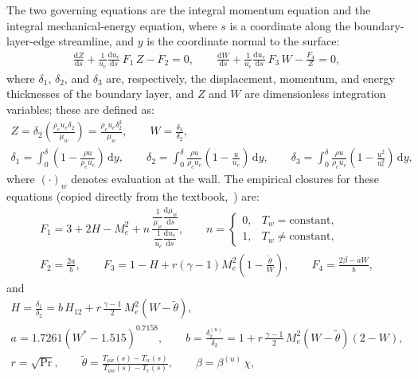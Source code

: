 \documentclass[10pt,a4paper]{article}
\begin{document}
The two governing equations are the integral momentum equation and the integral mechanical-energy equation, where $s$ is a coordinate along the boundary-layer-edge streamline, and $y$ is the coordinate normal to the surface:
\begin{gather}
    \frac{\mathrm{d}Z}{\mathrm{d}s}
    + \frac{1}{u_e}\frac{\mathrm{d}u_e}{\mathrm{d}s}\,F_1\,Z
    - F_2 = 0,\qquad
    \frac{\mathrm{d}W}{\mathrm{d}s}
    + \frac{1}{u_e}\frac{\mathrm{d}u_e}{\mathrm{d}s}\,F_3\,W
    - \frac{F_4}{Z} = 0,
\end{gather}
where $\delta_1$, $\delta_2$, and $\delta_3$ are, respectively, the displacement, momentum, and energy thicknesses of the boundary layer, and $Z$ and $W$ are dimensionless integration variables; these are defined as:
\begin{gather}
    Z = \delta_2\left(\frac{\rho_e u_e \delta_2}{\mu_w}\right)
    = \frac{\rho_e u_e \delta_2^2}{\mu_w},\qquad
    W = \frac{\delta_3}{\delta_2},\\[4pt]
    \delta_1 = \int_0^\delta
    \left(1-\frac{\rho u}{\rho_e u_e}\right)\,\mathrm{d}y,\qquad
    \delta_2 = \int_0^\delta
    \frac{\rho u}{\rho_e u_e}
    \left(1-\frac{u}{u_e}\right)\,\mathrm{d}y,\qquad
    \delta_3 = \int_0^\delta
    \frac{\rho u}{\rho_e u_e}
    \left(1-\frac{u^2}{u_e^2}\right)\,\mathrm{d}y,
\end{gather}
where ${(\cdot)}_w$ denotes evaluation at the wall. The empirical closures for these equations (copied directly from the textbook,~\cite{Walz:1969}) are:
\begin{gather}
    F_1 = 3 + 2H - M_e^2
    + n\,
    \frac{\dfrac{1}{\mu_w}\dfrac{\mathrm{d}\mu_w}{\mathrm{d}s}}
        {\dfrac{1}{u_e}\dfrac{\mathrm{d}u_e}{\mathrm{d}s}},
    \qquad
    n =
    \begin{cases}
    0, & T_w = \text{constant},\\
    1, & T_w \neq \text{constant},
    \end{cases}\\[6pt]
    F_2 = \frac{2a}{b},\qquad
    F_3 = 1 - H + r(\gamma-1)M_e^2\left(1-\frac{\widetilde{\theta}}{W}\right),\qquad
    F_4 = \frac{2\beta - aW}{b},
\end{gather}
and
\begin{gather}
    H = \frac{\delta_1}{\delta_2}
    = b\,H_{12}
    + r\,\frac{\gamma-1}{2}\,M_e^2\left(W-\widetilde{\theta}\right),\\[4pt]
    a = 1.7261\left(W^\ast - 1.515\right)^{0.7158},\qquad
    b = \frac{\delta_2^{(u)}}{\delta_2}
    = 1 + r\,\frac{\gamma-1}{2}\,M_e^2
    \left(W-\widetilde{\theta}\right)\left(2-W\right),\\[4pt]
    r = \sqrt{\Pr},\qquad
    \widetilde{\theta} =
    \frac{T_{aw}(s)-T_w(s)}{T_{aw}(s)-T_e(s)},\qquad
    \beta = \beta^{(u)}\,\chi,
\end{gather}
\end{document}
